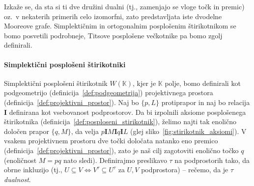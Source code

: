 \documentclass[fin1, tisk]{fmfdelo}
\newcommand{\II}{\mathbf{I}}
\newcommand{\PG}{\mathrm{PG}}
\begin{document}
Izkaže se, da sta si ti dve družini dualni (tj., zamenjajo se vloge točk in premic) oz.~v nekaterih 
primerih celo izomorfni, zato predstavljata iste dvodelne Mooreove grafe. Simplektičnim in ortogonalnim posplošenim
štirikotnikom se bomo posvetili podrobneje, Titsove posplošene večkotnike pa bomo zgolj definirali.


\paragraph{Simplektični posplošeni štirikotniki}

    



    Simplektični posplošeni štirikotnik $W(\mathbb{K})$\!, kjer je $\mathbb{K}$ polje, bomo definirali 
    kot podgeometrijo (definicija~\ref{def:podgeometrija}) projektivnega prostora (definicija~\ref{def:projektivni_prostor}).
    Naj bo $\{p, L\}$ protiprapor in naj bo relacija $\II$ definirana kot vsebovanost podprostorov.
    Da bi izpolnili aksiome posplošenega štirikotnika (definicija~\ref{def:posploseni_stirikotnik}), 
    želimo najti tak enolično določen prapor $\{q, M\}$, da velja $p \II M \II q \II L$ (glej sliko~\ref{fig:stirikotnik_aksiomi}).
    V vsakem projektivnem prostoru dve točki določata natanko eno premico (definicija~\ref{def:projektivni_prostor}), zato je naš cilj zagotoviti
    enolično točko $q$ (enoličnost $M=pq$ nato sledi). Definirajmo preslikavo $\tau$ na podprostorih tako, da obrne inkluzijo 
    (tj., $U \subseteq V \iff V^\tau \subseteq U^\tau$ za $U,V$ podprostora) -- rečemo, da je $\tau$ \emph{dualnost}.
\end{document}
